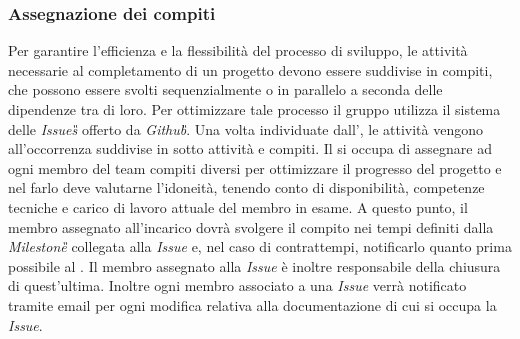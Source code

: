 	\subsubsection{Assegnazione dei compiti}
	Per garantire l'efficienza e la flessibilità del processo di sviluppo, le attività necessarie al completamento di un progetto devono essere suddivise in compiti, che possono essere svolti sequenzialmente o in parallelo a seconda delle dipendenze tra di loro. Per ottimizzare tale processo il gruppo utilizza il sistema delle \emph{Issues\G{}} offerto da \emph{Github\G}.	
	Una volta individuate dall'\Ana{}, le attività vengono all'occorrenza suddivise in sotto attività e compiti. Il \RdP{} si occupa di assegnare ad ogni membro del team compiti diversi per ottimizzare il progresso del progetto e nel farlo deve valutarne l'idoneità, tenendo conto di disponibilità, competenze tecniche e carico di lavoro attuale del membro in esame. A questo punto, il membro assegnato all'incarico dovrà svolgere il compito nei tempi definiti dalla \emph{Milestone\G{}} collegata alla \emph{Issue} e, nel caso di contrattempi, notificarlo quanto prima possibile al \RdP{}. Il membro assegnato alla \emph{Issue} è inoltre responsabile della chiusura di quest'ultima. Inoltre ogni membro associato a una \emph{Issue} verrà notificato tramite email per ogni modifica relativa alla documentazione %
	di cui si occupa la \emph{Issue}.